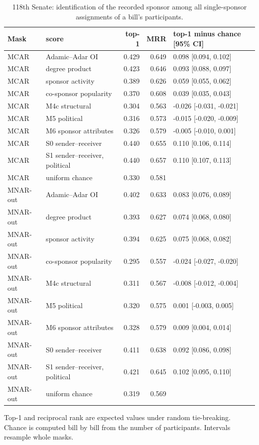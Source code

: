 \begin{table}[tbp]
\centering
\small
\caption{118th Senate: identification of the recorded sponsor among all single-sponsor assignments of a bill's participants.}
\label{tab:senate-role}
\begin{tabular}{llrrl}
\toprule
Mask & score & top-1 & MRR & top-1 minus chance [95\% CI] \\
\midrule
MCAR & Adamic--Adar OI & 0.429 & 0.649 & 0.098 [0.094, 0.102] \\
MCAR & degree product & 0.423 & 0.646 & 0.093 [0.088, 0.097] \\
MCAR & sponsor activity & 0.389 & 0.626 & 0.059 [0.055, 0.062] \\
MCAR & co-sponsor popularity & 0.370 & 0.608 & 0.039 [0.035, 0.043] \\
MCAR & M4c structural & 0.304 & 0.563 & -0.026 [-0.031, -0.021] \\
MCAR & M5 political & 0.316 & 0.573 & -0.015 [-0.020, -0.009] \\
MCAR & M6 sponsor attributes & 0.326 & 0.579 & -0.005 [-0.010, 0.001] \\
MCAR & S0 sender--receiver & 0.440 & 0.655 & 0.110 [0.106, 0.114] \\
MCAR & S1 sender--receiver, political & 0.440 & 0.657 & 0.110 [0.107, 0.113] \\
MCAR & uniform chance & 0.330 & 0.581 &  \\
MNAR-out & Adamic--Adar OI & 0.402 & 0.633 & 0.083 [0.076, 0.089] \\
MNAR-out & degree product & 0.393 & 0.627 & 0.074 [0.068, 0.080] \\
MNAR-out & sponsor activity & 0.394 & 0.625 & 0.075 [0.068, 0.082] \\
MNAR-out & co-sponsor popularity & 0.295 & 0.557 & -0.024 [-0.027, -0.020] \\
MNAR-out & M4c structural & 0.311 & 0.567 & -0.008 [-0.012, -0.004] \\
MNAR-out & M5 political & 0.320 & 0.575 & 0.001 [-0.003, 0.005] \\
MNAR-out & M6 sponsor attributes & 0.328 & 0.579 & 0.009 [0.004, 0.014] \\
MNAR-out & S0 sender--receiver & 0.411 & 0.638 & 0.092 [0.086, 0.098] \\
MNAR-out & S1 sender--receiver, political & 0.421 & 0.645 & 0.102 [0.095, 0.110] \\
MNAR-out & uniform chance & 0.319 & 0.569 &  \\
\bottomrule
\end{tabular}
\par\vspace{2pt}\footnotesize Top-1 and reciprocal rank are expected values under random tie-breaking. Chance is computed bill by bill from the number of participants. Intervals resample whole masks.
\end{table}